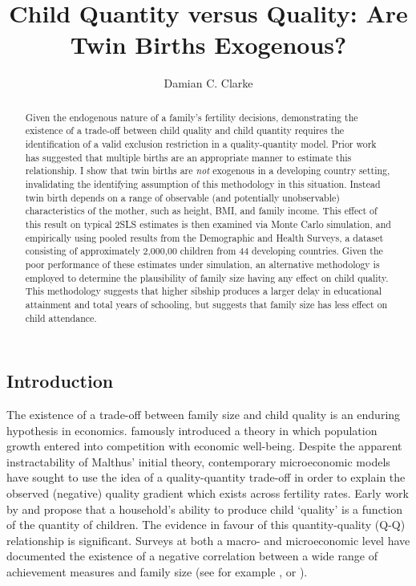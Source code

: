 \documentclass{article}[11pt,subeqn]
\title{Child Quantity versus Quality: Are Twin Births Exogenous?}
\author{Damian C. Clarke}
\begin{document}
\linenumbers
\begin{spacing}{1.25}

\maketitle
\begin{abstract}
Given the endogenous nature of a family's fertility decisions, demonstrating the existence of a trade-off between child quality and child quantity requires the identification of a 
valid exclusion restriction in a quality-quantity model.  Prior work has suggested that multiple births are an appropriate manner to estimate this relationship.  I show that twin 
births are \emph{not} exogenous in a developing country setting, invalidating the identifying assumption of this methodology in this situation.  Instead twin birth depends on a range of observable (and potentially unobservable) 
characteristics of the mother, such as height, BMI, and family income.  This effect of this result on typical 2SLS estimates is then examined via Monte Carlo simulation, and 
empirically using pooled results from the Demographic and Health Surveys, a dataset consisting of approximately 2,000,00 children from 44 developing countries.  Given the poor 
performance of these estimates under simulation, an alternative methodology is employed to determine the plausibility of family size having any effect on child quality.  This
methodology suggests that higher sibship produces a larger delay in educational attainment and total years of schooling, but suggests that family size has less effect on child
attendance.  
\end{abstract}

\section{Introduction}
\label{scn:intro}
The existence of a trade-off between family size and child quality is an enduring hypothesis in economics.  \citet{Malthus1798} famously introduced a theory in which population 
growth entered into competition with economic well-being.  Despite the apparent instractability of Malthus' initial theory, contemporary microeconomic models have sought to use 
the idea of a quality-quantity trade-off in order to explain the observed (negative) quality gradient which exists across fertility rates.  Early work by \citet{BeckerLewis1973} 
and \citet{BeckerTomes1976} propose that a household's ability to produce child `quality' is a function of the quantity of children.  The evidence in favour of this quantity-quality 
(Q-Q) relationship is significant.  Surveys at both a macro- and microeconomic level have documented the existence of a negative correlation between a wide range of achievement 
measures and family size (see for example \cite{Desai1995}, or \cite{Hanushek1992}).


\end{spacing}
\end{document}
